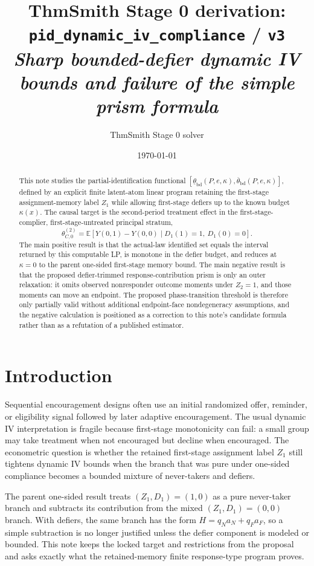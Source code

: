 \documentclass[11pt]{article}
\title{ThmSmith Stage 0 derivation: \texttt{pid\_dynamic\_iv\_compliance} / \texttt{v3}%
  \\ \large\textit{Sharp bounded-defier dynamic IV bounds and failure of the simple prism formula}}
\author{ThmSmith Stage 0 solver}
\date{\today}
\newcommand{\E}{\mathbb{E}}
\theoremstyle{definition}
\theoremstyle{plain}
\theoremstyle{remark}
\begin{document}
\maketitle


\begin{abstract}
This note studies the partial-identification functional
\([\underline\theta_{\mathrm{bd}}(P,e,\kappa),\overline\theta_{\mathrm{bd}}(P,e,\kappa)]\), defined by an explicit finite latent-atom linear program retaining the first-stage assignment-memory label \(Z_1\) while allowing first-stage defiers up to the known budget \(\kappa(x)\).
The causal target is the second-period treatment effect in the first-stage-complier, first-stage-untreated principal stratum,
\[
\theta_{C,0}^{(2)}
=\E\!\left[Y(0,1)-Y(0,0)\mid D_1(1)=1,\ D_1(0)=0\right].
\]
The main positive result is that the actual-law identified set equals the interval returned by this computable LP, is monotone in the defier budget, and reduces at \(\kappa=0\) to the parent one-sided first-stage memory bound.
The main negative result is that the proposed defier-trimmed response-contribution prism is only an outer relaxation: it omits observed nonresponder outcome moments under \(Z_2=1\), and those moments can move an endpoint.
The proposed phase-transition threshold is therefore only partially valid without additional endpoint-face nondegeneracy assumptions, and the negative calculation is positioned as a correction to this note's candidate formula rather than as a refutation of a published estimator.
\end{abstract}

\section{Introduction}
Sequential encouragement designs often use an initial randomized offer, reminder, or eligibility signal followed by later adaptive encouragement.
The usual dynamic IV interpretation is fragile because first-stage monotonicity can fail: a small group may take treatment when not encouraged but decline when encouraged.
The econometric question is whether the retained first-stage assignment label \(Z_1\) still tightens dynamic IV bounds when the branch that was pure under one-sided compliance becomes a bounded mixture of never-takers and defiers.

The parent one-sided result treats \((Z_1,D_1)=(1,0)\) as a pure never-taker branch and subtracts its contribution from the mixed \((Z_1,D_1)=(0,0)\) branch.
With defiers, the same branch has the form \(H=q_N a_N+q_F a_F\), so a simple subtraction is no longer justified unless the defier component is modeled or bounded.
This note keeps the locked target and restrictions from the proposal and asks exactly what the retained-memory finite response-type program proves.
\end{document}
